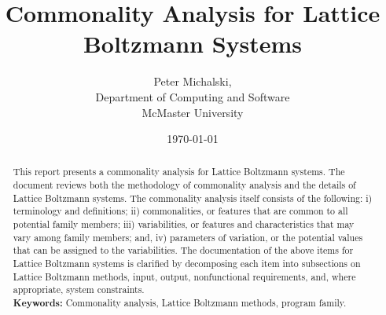 \documentclass[12pt]{article}
\begin{document}
\title{\bf{Commonality Analysis for Lattice Boltzmann Systems}} 
\author{Peter Michalski, \\Department of Computing and Software\\McMaster University}
\date{\today}

\begin{titlepage}
	\clearpage\maketitle
	\thispagestyle{empty}
	\begin{abstract}
		This report presents a commonality analysis for Lattice Boltzmann systems. The document reviews both the methodology of commonality analysis and the details of Lattice Boltzmann systems. The commonality analysis itself consists of the following:
		i) terminology and definitions; ii) commonalities, or features that are common to all potential family members; iii) variabilities, or features and characteristics that may vary among family members; and, iv) parameters of variation, or the potential values that can be assigned to the variabilities. 
		The documentation of the above items for Lattice Boltzmann systems is clarified by decomposing each item into subsections on Lattice Boltzmann methods, input, output, nonfunctional
		requirements, and, where appropriate, system constraints.\\
		
		\noindent\textbf{Keywords:} Commonality analysis, Lattice Boltzmann methods, program family.
		
	\end{abstract}
\end{titlepage}


\newpage

\tableofcontents

\newpage

\end{document}
